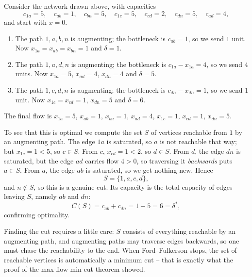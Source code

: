 \begin{example}
    Consider the network drawn above, with capacities
    $$
    c_{1a} = 5,\quad c_{ab} = 1,\quad c_{bn} = 5,\quad c_{1c} = 5,\quad c_{cd} = 2,\quad c_{dn} = 5,\quad c_{ad} = 4,
    $$
    and start with $x = 0$.
    \begin{enumerate}[label=(\roman*)]
        \item The path $1, a, b, n$ is augmenting; the bottleneck is $c_{ab} = 1$, so we send $1$ unit. Now $x_{1a} = x_{ab} = x_{bn} = 1$ and $\delta = 1$.
        \item The path $1, a, d, n$ is augmenting; the bottleneck is $c_{1a} - x_{1a} = 4$, so we send $4$ units. Now $x_{1a} = 5$, $x_{ad} = 4$, $x_{dn} = 4$ and $\delta = 5$.
        \item The path $1, c, d, n$ is augmenting; the bottleneck is $c_{dn} - x_{dn} = 1$, so we send $1$ unit. Now $x_{1c} = x_{cd} = 1$, $x_{dn} = 5$ and $\delta = 6$.
    \end{enumerate}
    The final flow is $x_{1a} = 5$, $x_{ab} = 1$, $x_{bn} = 1$, $x_{ad} = 4$, $x_{1c} = 1$, $x_{cd} = 1$, $x_{dn} = 5$.

    To see that this is optimal we compute the set $S$ of vertices reachable from $1$ by an augmenting path. The edge $1a$ is saturated, so $a$ is not reachable that way; but $x_{1c} = 1 < 5$, so $c \in S$. From $c$, $x_{cd} = 1 < 2$, so $d \in S$. From $d$, the edge $dn$ is saturated, but the edge $ad$ carries flow $4 > 0$, so traversing it \emph{backwards} puts $a \in S$. From $a$, the edge $ab$ is saturated, so we get nothing new. Hence
    $$
    S = \{1, a, c, d\},
    $$
    and $n \notin S$, so this is a genuine cut. Its capacity is the total capacity of edges leaving $S$, namely $ab$ and $dn$:
    $$
    C(S) = c_{ab} + c_{dn} = 1 + 5 = 6 = \delta^*,
    $$
    confirming optimality.
\end{example}

\begin{remark}
    Finding the cut requires a little care: $S$ consists of everything reachable by an augmenting path, and augmenting paths may traverse edges backwards, so one must chase the reachability to the end. When Ford--Fulkerson stops, the set of reachable vertices is automatically a minimum cut -- that is exactly what the proof of the max-flow min-cut theorem showed.
\end{remark}

